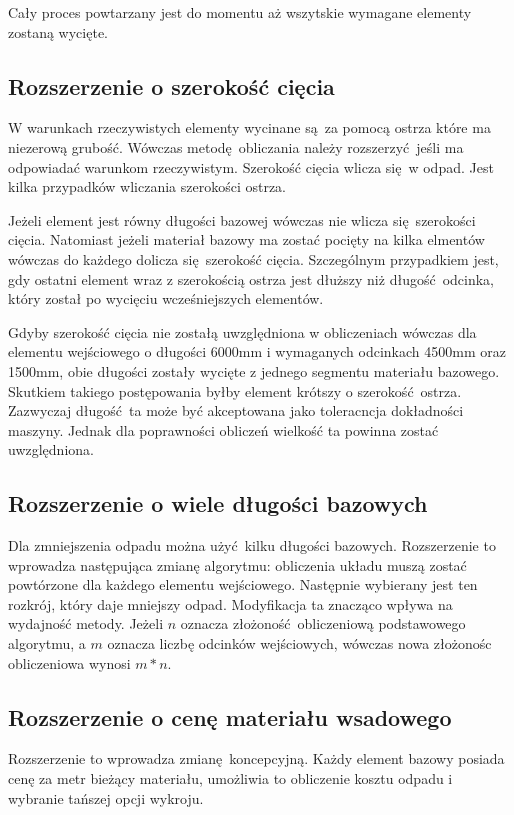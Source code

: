 Cały proces powtarzany jest do momentu aż wszytskie wymagane elementy zostaną wycięte.

\subsection{Rozszerzenie o szerokość cięcia}
W warunkach rzeczywistych elementy wycinane są za pomocą ostrza które ma niezerową grubość. Wówczas metodę obliczania należy rozszerzyć jeśli ma odpowiadać warunkom rzeczywistym. Szerokość cięcia wlicza się w odpad. Jest kilka przypadków wliczania szerokości ostrza.

Jeżeli element jest równy długości bazowej wówczas nie wlicza się szerokości cięcia. Natomiast jeżeli materiał bazowy ma zostać pocięty na kilka elmentów wówczas do każdego dolicza się szerokość cięcia. Szczególnym przypadkiem jest, gdy ostatni element wraz z szerokością ostrza jest dłuższy niż długość odcinka, który został po wycięciu wcześniejszych elementów.

Gdyby szerokość cięcia nie zostałą uwzględniona w obliczeniach wówczas dla elementu wejściowego o długości 6000mm i wymaganych odcinkach 4500mm oraz 1500mm, obie długości zostały wycięte z jednego segmentu materiału bazowego. Skutkiem takiego postępowania byłby element krótszy o szerokość ostrza. Zazwyczaj długość ta może być akceptowana jako toleracncja dokładności maszyny. Jednak dla poprawności obliczeń wielkość ta powinna zostać uwzględniona.

\subsection{Rozszerzenie o wiele długości bazowych}
Dla zmniejszenia odpadu można użyć kilku długości bazowych. Rozszerzenie to wprowadza następująca zmianę algorytmu: obliczenia układu muszą zostać powtórzone dla każdego elementu wejściowego. Następnie wybierany jest ten rozkrój, który daje mniejszy odpad. Modyfikacja ta znacząco wpływa na wydajność metody. Jeżeli $n$ oznacza złożoność obliczeniową podstawowego algorytmu, a $m$ oznacza liczbę odcinków wejściowych, wówczas nowa złożonośc obliczeniowa wynosi $m*n$. %

\subsection{Rozszerzenie o cenę materiału wsadowego}
Rozszerzenie to wprowadza zmianę koncepcyjną. Każdy element bazowy posiada cenę za metr bieżący materiału, umożliwia to obliczenie kosztu odpadu i wybranie tańszej opcji wykroju.

